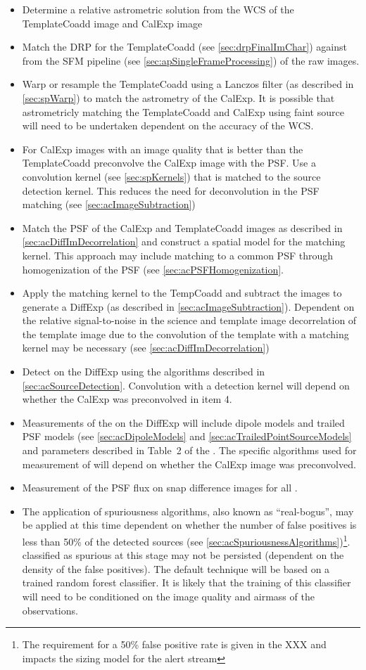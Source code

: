 \begin{itemize}
\item Determine a relative astrometric solution from the WCS of the TemplateCoadd image and CalExp image
\item Match the DRP \Sources for the TemplateCoadd (see \ref{sec:drpFinalImChar}) against \Sources from the SFM pipeline (see \ref{sec:apSingleFrameProcessing}) of the raw images.
\item Warp or resample the TemplateCoadd using a Lanczos filter  (as described in \ref{sec:spWarp}) to match the astrometry of the CalExp. It is possible that astrometricly matching the TemplateCoadd and CalExp using faint source will need to be undertaken dependent on the accuracy of the WCS.
\item For CalExp images with an image quality that is better than the TemplateCoadd preconvolve the CalExp image with the PSF. Use a  convolution kernel (see \ref{sec:spKernels}) that is matched to the source detection kernel. This reduces the need for deconvolution in the PSF matching (see \ref{sec:acImageSubtraction})
\item Match the PSF of the CalExp and TemplateCoadd images as described in \ref{sec:acDiffImDecorrelation} and construct a spatial model for the matching kernel. This approach may include matching to a common PSF through homogenization of the PSF (see \ref{sec:acPSFHomogenization}.
\item Apply the matching kernel to the TempCoadd and subtract the images to generate a DiffExp (as described in \ref{sec:acImageSubtraction}). Dependent on the relative signal-to-noise in the science and template image decorrelation of the template image due to the convolution of the template with a matching kernel may be necessary (see \ref{sec:acDiffImDecorrelation})
\item Detect \DIASources on the DiffExp using the algorithms described in \ref{sec:acSourceDetection}. Convolution with a detection kernel will depend on whether the CalExp was preconvolved in item 4.
\item Measurements of the \DIASources on the DiffExp will include dipole models and trailed PSF models (see  \ref{sec:acDipoleModels} and \ref{sec:acTrailedPointSourceModels} and parameters described in Table~2 of the \DPDD . The specific algorithms used for measurement of \DIASources will depend on whether the CalExp image was preconvolved.
\item Measurement of the PSF flux on snap difference images for all \DIASources.
\item The application of spuriousness algorithms, also known as ``real-bogus'', may be applied at this time dependent on whether the number of false positives is less than 50\% of the detected sources (see \ref{sec:acSpuriousnessAlgorithms})\footnote{The requirement for a 50\% false positive rate is given in the XXX and impacts the sizing model for the alert stream}. \DIASources classified as spurious at this stage may not be persisted (dependent on the density of the false positives). The default technique will be based on a trained random forest classifier. It is likely that the training of this classifier will need to be conditioned on the image quality and airmass of the observations.

\end{itemize}
